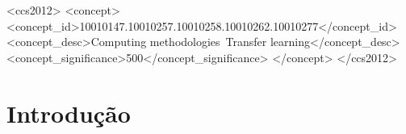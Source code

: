 \documentclass[sigconf]{acmart}
\begin{document}

  
  

%
%

\begin{CCSXML}
<ccs2012>
 <concept>
 <concept_id>10010147.10010257.10010258.10010262.10010277</concept_id>
 <concept_desc>Computing methodologies~Transfer learning</concept_desc>
 <concept_significance>500</concept_significance>
 </concept>
</ccs2012>
\end{CCSXML}



%


%

%
\maketitle

\section{Introdução} 
\end{document}
